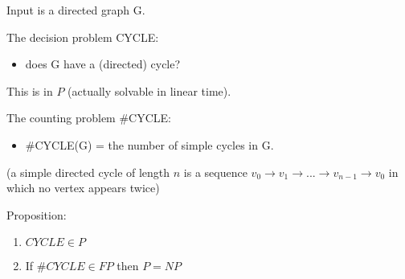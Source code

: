 \documentclass[a4paper,12pt]{article}
\theoremstyle{definition}
\theoremstyle{remark}
\begin{document}
Input is a directed graph G.

The decision problem CYCLE:
\begin{itemize}
    \item does G have a (directed) cycle?
\end{itemize}
This is in $P$ (actually solvable in linear time).


The counting problem $\#$CYCLE:
\begin{itemize}
    \item $\#$CYCLE(G) = the number of simple cycles in G.
\end{itemize}

(a simple directed cycle of length $n$ is a sequence $v_0 \to v_1 \to ... \to v_{n-1} \to v_0$ in which no vertex appears twice)

Proposition:
\begin{enumerate}
    \item $CYCLE \in P$
    \item If $\#CYCLE \in FP$ then $P = NP$
\end{enumerate}
\end{document}
